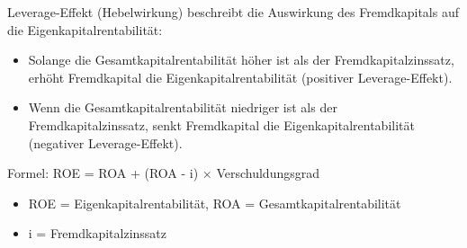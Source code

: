 \begin{concept}{Leverage-Effekt}
     (Hebelwirkung) beschreibt die Auswirkung des Fremdkapitals auf die Eigenkapitalrentabilität:
\begin{itemize}
    \item Solange die Gesamtkapitalrentabilität höher ist als der Fremdkapitalzinssatz, erhöht Fremdkapital die Eigenkapitalrentabilität (positiver Leverage-Effekt).
    \item Wenn die Gesamtkapitalrentabilität niedriger ist als der Fremdkapitalzinssatz, senkt Fremdkapital die Eigenkapitalrentabilität (negativer Leverage-Effekt).
\end{itemize}

Formel: ROE = ROA + (ROA - i) $\times$ Verschuldungsgrad
\begin{itemize}
    \item ROE = Eigenkapitalrentabilität, ROA = Gesamtkapitalrentabilität
    \item i = Fremdkapitalzinssatz
\end{itemize}
\end{concept}

